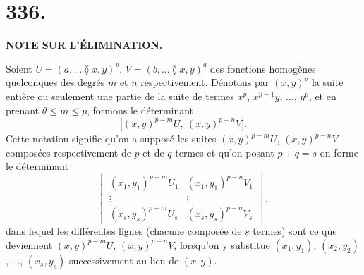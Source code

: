 \documentclass[11pt,a4paper]{article}
\begin{document}
\section*{336.}

\begin{center}
\textbf{NOTE SUR L'\'ELIMINATION.}
\end{center}


\bigskip

\noindent Soient $U=(a,\ldots\!\between\! x,y)^p$, $V=(b,\ldots\!\between\! x,y)^q$ des fonctions homog\`{e}nes quelconques des degr\'{e}s $m$ et $n$ respectivement. D\'{e}notons par $(x,y)^p$ la suite enti\`{e}re ou seulement une partie de la suite de termes $x^p$, $x^{p-1}y$, $\ldots$, $y^p$, et en prenant $\theta\leq m\leq p$, formons le d\'{e}terminant
\[
|(x,y)^{p-m}U,\ (x,y)^{p-n}V|.
\]
Cette notation signifie qu'on a suppos\'{e} les suites $(x,y)^{p-m}U$, $(x,y)^{p-n}V$ compos\'{e}es respectivement de $p$ et de $q$ termes et qu'on posant $p+q=s$ on forme le d\'{e}terminant
\[
\begin{vmatrix}
(x_1, y_1)^{p-m}U_1 & (x_1, y_1)^{p-n}V_1 \\
\vdots & \vdots \\
(x_s, y_s)^{p-m}U_s & (x_s, y_s)^{p-n}V_s
\end{vmatrix},
\]
dans lequel les diff\'{e}rentes lignes (chacune compos\'{e}e de $s$ termes) sont ce que deviennent
$(x,y)^{p-m}U$, $(x,y)^{p-n}V$, lorsqu'on y substitue $(x_1,y_1)$, $(x_2,y_2)$, $\ldots$, $(x_s,y_s)$ successivement au lieu de $(x,y)$.

\medskip
\end{document}
